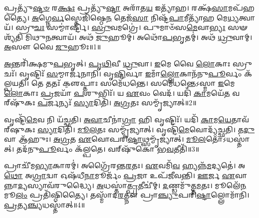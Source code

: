 \clearpage
{}
\setcounter{anuvakam}{0}

𑌪𑍍𑌰𑌤𑍍𑌯𑍁᳴\-\ul{𑌷𑍍𑌟}\-\-\ul{𑍞} 𑌰\-\ul{𑌕𑍍𑌷𑌃} 𑌪𑍍𑌰𑌤𑍍𑌯𑍁᳴\-\ul{𑌷𑍍𑌟𑌾} 𑌅𑌰𑌾᳴𑌤\-\ul{𑌯} 𑌇𑌤𑍍𑌯𑌾᳴𑌹।
𑌰𑌕𑍍𑌷᳴\-\ul{𑌸𑌾}\-𑌮𑌪᳴𑌹𑌤𑍍𑌯𑍈।
\-\ul{𑌅}\-𑌗𑍍𑌨𑍇\-\ul{𑌰𑍍𑌵}\-𑌸𑍍𑌤𑍇𑌜𑌿᳴𑌷𑍍𑌠𑍇\-\ul{𑌨} 𑌤𑍇𑌜᳴\-\ul{𑌸𑌾} 𑌨𑌿𑌷𑍍𑌟᳴\-\ul{𑌪𑌾}\-𑌮𑍀𑌤𑍍𑌯𑌾᳴𑌹 𑌮𑍇\-\ul{𑌧𑍍𑌯}\-𑌤𑍍𑌵𑌾𑌯᳴।
𑌸𑍍𑌰𑍁\-\ul{𑌚𑌃} 𑌸𑌮𑍍𑌮𑌾॑𑌰𑍍𑌷𑍍𑌟𑌿।
\-\ul{𑌸𑍍𑌰𑍁}\-𑌵𑌮𑌗𑍍𑌰𑍇॑।
𑌪𑍁𑌮𑌾𑍞᳴𑌸\-\ul{𑌮𑍇}\-𑌵𑌾\-\ul{𑌭𑍍𑌯𑌃} 𑌸𑍟𑌶𑍍𑌯᳴𑌤𑌿 𑌮𑌿𑌥𑍁\-\ul{𑌨}\-𑌤𑍍𑌵𑌾𑌯᳴।
𑌅𑌥᳴ \ul{𑌜𑍁}\-𑌹𑍂𑌮𑍍।
𑌅𑌥𑍋᳴\-\ul{𑌪}\-𑌭𑍃𑌤𑌮𑍍॑।
𑌅𑌥᳴ \ul{𑌧𑍍𑌰𑍁}\-𑌵𑌾𑌮𑍍।
\-\ul{𑌅}\-𑌸𑍗 𑌵𑍈 \ul{𑌜𑍁}\-𑌹𑍂𑌃॥1॥

\-\ul{𑌅}\-𑌨𑍍𑌤𑌰𑌿᳴𑌕𑍍𑌷𑌮𑍁\-\ul{𑌪}\-𑌭𑍃𑌤𑍍।
\-\ul{𑌪𑍃}\-\-\ul{𑌥𑌿}\-𑌵𑍀 \ul{𑌧𑍍𑌰𑍁}\-𑌵𑌾।
\-\ul{𑌇}\-𑌮𑍇 𑌵𑍈 \ul{𑌲𑍋}\-𑌕𑌾𑌃 𑌸𑍍𑌰𑍁𑌚𑌃᳴।
𑌵𑍃𑌷𑍍𑌟𑌿𑌃᳴ \ul{𑌸}\-𑌮𑍍𑌮𑌾𑌰𑍍𑌜᳴𑌨𑌾𑌨𑌿।
𑌵𑍃\-\ul{𑌷𑍍𑌟𑌿}\-𑌰𑍍𑌵𑌾 \ul{𑌇}\-𑌮𑌾𑌁\-\ul{𑌲𑍍𑌲𑍋}\-𑌕𑌾𑌨᳴𑌨𑍁\-\ul{𑌪𑍂}\-𑌰𑍍𑌵𑌂 𑌕᳴𑌲𑍍𑌪𑌯𑌤𑌿।
𑌤𑍇 𑌤𑌤𑌃᳴ 𑌕𑍢॒𑌪𑍍𑌤𑌾𑌃 𑌸𑌮𑍇᳴𑌧𑌨𑍍𑌤𑍇।
𑌸𑌮𑍇᳴𑌧𑌨𑍍𑌤𑍇\-𑌽𑌸𑍍𑌮𑌾 \ul{𑌇}\-𑌮𑍇 \ul{𑌲𑍋}\-𑌕𑌾𑌃 \ul{𑌪𑍍𑌰}\-𑌜𑌯𑌾᳴ \ul{𑌪}\-𑌶𑍁𑌭𑌿𑌃᳴।
𑌯 \ul{𑌏}\-𑌵𑌂 𑌵𑍇𑌦᳴।
𑌯𑌦𑌿᳴ \ul{𑌕𑌾}\-𑌮𑌯𑍇᳴\-\ul{𑌤} 𑌵𑌰𑍍‌\mbox{}𑌷𑍁᳴𑌕𑌃 \ul{𑌪}\-𑌰𑍍𑌜𑌨𑍍𑌯𑌃᳴ \ul{𑌸𑍍𑌯𑌾}\-𑌦𑌿𑌤𑌿᳴।
\-\ul{𑌅}\-\-\ul{𑌗𑍍𑌰}\-𑌤𑌃 𑌸𑌮𑍍𑌮𑍃᳴𑌜𑍍𑌯𑌾𑌤𑍍॥2॥

𑌵𑍃𑌷𑍍𑌟𑌿᳴\-\ul{𑌮𑍇}\-𑌵 𑌨𑌿 𑌯᳴𑌚𑍍𑌛𑌤𑌿।
\-\ul{𑌅}\-\-\ul{𑌵𑌾}\-𑌚𑍀𑌨𑌾॑\-\ul{𑌗𑍍𑌰𑌾} 𑌹𑌿 𑌵𑍃𑌷𑍍𑌟𑌿𑌃᳴।
𑌯𑌦𑌿᳴ \ul{𑌕𑌾}\-𑌮\-\ul{𑌯𑍇}\-𑌤𑌾𑌵᳴𑌰𑍍‌\mbox{}𑌷𑍁𑌕𑌃 \ul{𑌸𑍍𑌯𑌾}\-𑌦𑌿𑌤𑌿᳴।
\-\ul{𑌮𑍂}\-\-\ul{𑌲}\-𑌤𑌃 𑌸𑌮𑍍𑌮𑍃᳴𑌜𑍍𑌯𑌾𑌤𑍍।
𑌵𑍃𑌷𑍍𑌟𑌿᳴\-\ul{𑌮𑍇}\-𑌵𑍋𑌦𑍍𑌯᳴𑌚𑍍𑌛𑌤𑌿।
𑌤\-\ul{𑌦𑍁} 𑌵𑌾 𑌆᳴𑌹𑍁𑌃।
\-\ul{𑌅}\-\-\ul{𑌗𑍍𑌰}\-𑌤 \ul{𑌏}\-𑌵𑍋𑌪𑌰𑌿᳴\-\ul{𑌷𑍍𑌟𑌾}\-𑌥𑍍𑌸𑌮𑍍𑌮𑍃᳴\-𑌜𑍍𑌯𑌾𑌤𑍍।
\-\ul{𑌮𑍂}\-\-\ul{𑌲}\-𑌤𑍋᳴\-𑌽𑌧𑌸𑍍𑌤𑌾॑𑌤𑍍।
𑌤𑌦᳴𑌨𑍁\-\ul{𑌪𑍂}\-𑌰𑍍𑌵𑌂 𑌕᳴𑌲𑍍𑌪𑌤𑍇।
𑌵𑌰𑍍‌\mbox{}𑌷𑍁᳴𑌕𑍋 𑌭\-\ul{𑌵}\-𑌤𑍀𑌤𑌿᳴॥3॥

𑌪𑍍𑌰𑌾𑌚𑍀᳴𑌮\-\ul{𑌭𑍍𑌯𑌾}\-𑌕𑌾𑌰𑌮𑍍॑।
𑌅𑌗𑍍𑌰𑍈᳴𑌰𑌨𑍍𑌤\-\ul{𑌰}\-𑌤𑌃।
\-\ul{𑌏}\-𑌵𑌮𑌿᳴\-\ul{𑌵} 𑌹𑍍𑌯𑌨𑍍𑌨᳴\-\ul{𑌮}\-𑌦𑍍𑌯𑌤𑍇॑।
𑌅\-\ul{𑌥𑍋} 𑌅\-\ul{𑌗𑍍𑌰𑌾}\-𑌦𑍍𑌵𑌾 𑌓𑌷᳴𑌧𑍀\-\ul{𑌨𑌾}\-𑌮𑍂𑌰𑍍𑌜𑌂᳴ \ul{𑌪𑍍𑌰}\-𑌜𑌾 𑌉𑌪᳴𑌜𑍀𑌵𑌨𑍍𑌤𑌿।
\-\ul{𑌊}\-𑌰𑍍𑌜 \ul{𑌏}\-𑌵𑌾𑌨𑍍𑌨𑌾\-\ul{𑌦𑍍𑌯}\-𑌸𑍍𑌯𑌾𑌵᳴𑌰𑍁𑌦𑍍𑌧𑍍𑌯𑍈।
\-\ul{𑌅}\-𑌧𑌸𑍍𑌤𑌾॑\-\ul{𑌤𑍍𑌪𑍍𑌰}\-𑌤𑍀𑌚𑍀॑𑌮𑍍।
\-\ul{𑌦}\-𑌣𑍍𑌡𑌮𑍁᳴𑌤𑍍𑌤\-\ul{𑌮}\-𑌤𑌃।
𑌮𑍂𑌲𑍇᳴\-\ul{𑌨} 𑌮𑍂\-\ul{𑌲𑌂} 𑌪𑍍𑌰𑌤𑌿᳴\-𑌷𑍍𑌠𑌿𑌤𑍍𑌯𑍈।
𑌤𑌸𑍍𑌮𑌾᳴𑌦\-\ul{𑌰}\-𑌤𑍍𑌨𑍗 𑌪𑍍𑌰𑌾\-\ul{𑌞𑍍𑌚𑍍𑌯𑍁}\-𑌪𑌰𑌿᳴\-\ul{𑌷𑍍𑌟𑌾}\-𑌲𑍍𑌲𑍋𑌮𑌾᳴𑌨𑌿।
\-\ul{𑌪𑍍𑌰}\-𑌤𑍍𑌯\-\ul{𑌞𑍍𑌚𑍍𑌯}\-𑌧𑌸𑍍𑌤𑌾॑𑌤𑍍॥4॥

